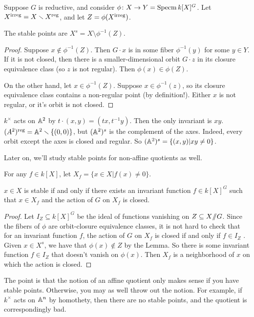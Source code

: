 Suppose $G$ is reductive, and consider $\phi\colon X\to Y=\specm k[X]^G$. Let $X^\irr=X\setminus X^\reg$, and let $Z=\phi(X^\irr)$. 
\begin{lemma}
 The stable points are $X^s=X\setminus \phi^{-1}(Z)$.
\end{lemma}
\begin{proof}
 Suppose $x\not\in \phi^{-1}(Z)$. Then $G\cdot x$ is in some fiber $\phi^{-1}(y)$ for some $y\in Y$. If it is not closed, then there is a smaller-dimensional orbit $G\cdot z$ in its closure equivalence class (so $z$ is not regular). Then $\phi(x)\in \phi(Z)$.
 
 On the other hand, let $x\in \phi^{-1}(Z)$. Suppose $x\in \phi^{-1}(z)$, so its closure equivalence class contains a non-regular point (by definition!). Either $x$ is not regular, or it's orbit is not closed.
\end{proof}

\begin{example}
 $k^\times$ acts on $\AA^2$ by $t\cdot (x,y)=(tx,t^{-1}y)$. Then the only invariant is $xy$. $(A^2)^\reg=\AA^2\setminus \{(0,0)\}$, but $(\AA^2)^s$ is the complement of the axes. Indeed, every orbit except the axes is closed and regular. So $(\AA^2)^s=\{(x,y)|xy\neq 0\}$.
\end{example}

Later on, we'll study stable points for non-affine quotients as well.

For any $f\in k[X]$, let $X_f=\{x\in X|f(x)\neq 0\}$.
\begin{proposition}
 $x\in X$ is stable if and only if there exists an invariant function $f\in k[X]^G$ such that $x\in X_f$ and the action of $G$ on $X_f$ is closed.
\end{proposition}
\begin{proof}
 Let $I_Z\subseteq k[X]^G$ be the ideal of functions vanishing on $Z\subseteq X\quot G$. Since the fibers of $\phi$ are orbit-closure equivalence classes, it is not hard to check that for an invariant function $f$, the action of $G$ on $X_f$ is closed if and only if $f\in I_Z$ . Given $x\in X^s$, we have that $\phi(x)\not\in Z$ by the Lemma. So there is some invariant function $f\in I_Z$ that doesn't vanish on $\phi(x)$. Then $X_f$ is a neighborhood of $x$ on which the action is closed.
\end{proof}
The point is that the notion of an affine quotient only makes sense if you have stable points. Otherwise, you may as well throw out the notion. For example, if $k^\times$ acts on $\AA^n$ by homothety, then there are no stable points, and the quotient is correspondingly bad.

